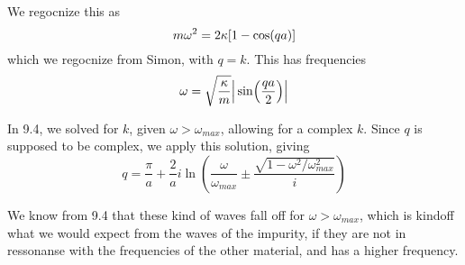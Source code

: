 \documentclass[12p,a4paper]{article}
\begin{document}
We regocnize this as
\[
    m\omega^2 =2\kappa\qty[1 - \cos(qa)]
\]
which we regocnize from Simon, with $q = k$. This has frequencies
\[
    \omega = \sqrt{\frac{\kappa}{m}}\qty|\, \sin(\frac{qa}{2})|
\]

In 9.4, we solved for $k$, given $\omega > \omega_{max}$, allowing for a complex $k$. Since $q$ is supposed to be complex, we apply this solution, giving
\[
    q = \frac{\pi}{a} + \frac{2}{a}i\ln(\frac{\omega}{\omega_{max}} \pm \frac{\sqrt{1 - \omega^2/\omega_{max}^2}}{i})
\]

We know from 9.4 that these kind of waves fall off for $\omega > \omega_{max}$, which is kindoff what we would expect from the waves of the impurity, if they are not in ressonanse with the frequencies of the other material, and has a higher frequency.
\end{document}
